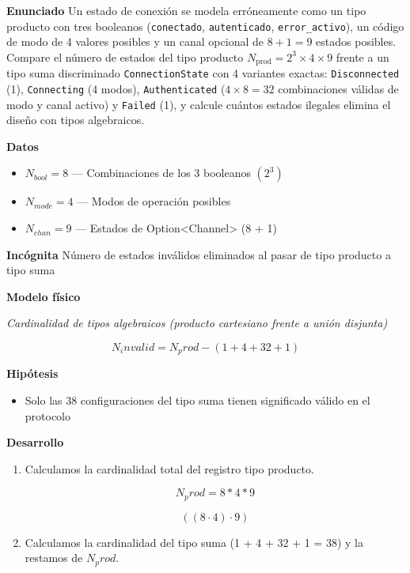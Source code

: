 \documentclass{book}
\begin{document}
\begin{tcolorbox}[title={Problema resuelto}, studiumworked, breakable]

\noindent\textbf{Enunciado}
Un estado de conexión se modela erróneamente como un tipo producto con tres booleanos (\texttt{conectado}, \texttt{autenticado}, \texttt{error\_activo}), un código de modo de 4 valores posibles y un canal opcional de \(8 + 1 = 9\) estados posibles. Compare el número de estados del tipo producto \(N_{\text{prod}} = 2^3 \times 4 \times 9\) frente a un tipo suma discriminado \texttt{ConnectionState} con 4 variantes exactas: \texttt{Disconnected} (1), \texttt{Connecting} (4 modos), \texttt{Authenticated} (\(4 \times 8 = 32\) combinaciones válidas de modo y canal activo) y \texttt{Failed} (1), y calcule cuántos estados ilegales elimina el diseño con tipos algebraicos.

\noindent\textbf{Datos}
\begin{itemize}
\item $N_{bool} = 8$ — Combinaciones de los 3 booleanos \((2^3)\)
\item $N_{mode} = 4$ — Modos de operación posibles
\item $N_{chan} = 9$ — Estados de Option<Channel> (8 + 1)
\end{itemize}

\noindent\textbf{Incógnita}
Número de estados inválidos eliminados al pasar de tipo producto a tipo suma

\noindent\textbf{Modelo físico}

\noindent\textit{Cardinalidad de tipos algebraicos (producto cartesiano frente a unión disjunta)}

\[
N_invalid = N_prod - (1 + 4 + 32 + 1)
\]

\noindent\textbf{Hipótesis}
\begin{itemize}
\item Solo las 38 configuraciones del tipo suma tienen significado válido en el protocolo
\end{itemize}

\noindent\textbf{Desarrollo}
\begin{enumerate}
\item
Calculamos la cardinalidad total del registro tipo producto.

\[
N_prod = 8 * 4 * 9
\]

\[
\left(\left(8\cdot 4\right)\cdot 9\right)
\]
\item
Calculamos la cardinalidad del tipo suma (1 + 4 + 32 + 1 = 38) y la restamos de \(N_prod\).


\end{enumerate}
\end{tcolorbox}
\end{document}
